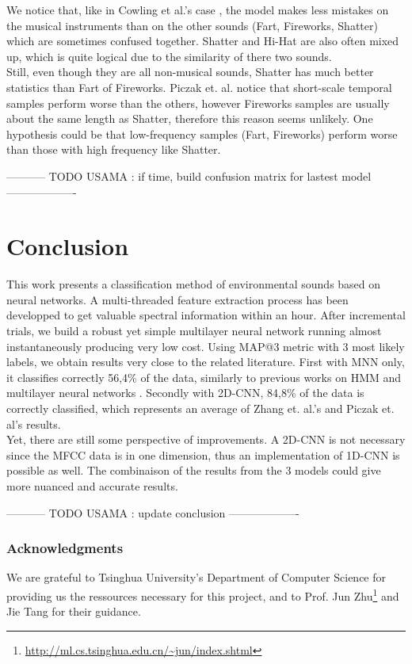 \documentclass{article} %
\begin{document}
		We notice that, like in Cowling et al.'s case \cite{Cowling}, the model makes less mistakes on the musical instruments than on the other sounds (Fart, Fireworks, Shatter) which are sometimes confused together. Shatter and Hi-Hat are also often mixed up, which is quite logical due to the similarity of there two sounds.\\
        Still, even though they are all non-musical sounds, Shatter has much better statistics than Fart of Fireworks. Piczak et. al. \cite{Piczak} notice that short-scale temporal samples perform worse than the others, however Fireworks samples are usually about the same length as Shatter, therefore this reason seems unlikely. One hypothesis could be that low-frequency samples (Fart, Fireworks) perform worse than those with high frequency like Shatter.

        ----------- TODO USAMA : if time, build confusion matrix for lastest model -------------------



\section{Conclusion}

	This work presents a classification method of environmental sounds based on neural networks. A multi-threaded feature extraction process has been developped to get valuable spectral information within an hour. After incremental trials, we build a robust yet simple multilayer neural network running almost instantaneously producing very low cost. Using MAP@3 metric with 3 most likely labels, we obtain results very close to the related literature. First with MNN only, it classifies correctly 56,4\% of the data, similarly to previous works on HMM \cite{Dufaux} and multilayer neural networks \cite{Toyoda}. Secondly with 2D-CNN, 84,8\% of the data is correctly classified, which represents an average of Zhang et. al.'s \cite{Zhang} and Piczak et. al's \cite{Piczak} results. \\
	Yet, there are still some perspective of improvements. A 2D-CNN is not necessary since the MFCC data is in one dimension, thus an implementation of 1D-CNN is possible as well. The combinaison of the results from the 3 models could give more nuanced and accurate results.

	----------- TODO USAMA : update conclusion  -------------------

\subsubsection*{Acknowledgments}
	We are grateful to Tsinghua University's Department of Computer Science for providing us the ressources necessary for this project,
	and to Prof. Jun Zhu\footnote{\url{http://ml.cs.tsinghua.edu.cn/~jun/index.shtml}} and Jie Tang for their guidance.

\nocite{*}


\end{document}
